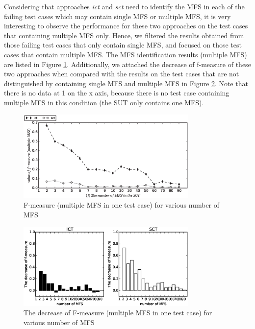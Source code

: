 \documentclass[10pt,journal,compsoc]{IEEEtran}
\begin{document}
{\color{blue}
Considering that approaches \emph{ict} and \emph{sct} need to identify the MFS in each of the failing test cases which may contain single MFS or multiple MFS, it is very interesting to observe the performance for these two approaches on the test cases that containing multiple MFS only. Hence, we filtered the results obtained from those failing test cases that only contain single MFS, and focused on those test cases that contain multiple MFS. The MFS identification results (multiple MFS) are listed in Figure \ref{sen_mfs_multi_tests_result}. Additionally, we attached the decrease of f-measure of these two approaches when compared with the results on the test cases that are  not distinguished by containing single MFS and multiple MFS in Figure \ref{decrease_sen_mfs_multi_tests_result}. Note that there is no data at 1 on the x axis, because there is no test case containing multiple MFS in this condition (the SUT only contains one MFS).

\begin{figure}[htbp]
 \includegraphics[width=3.5in]{fmeasuremulti.eps}
\caption{F-measure (multiple MFS in one test case) for various number of MFS}
\label{sen_mfs_multi_tests_result}
\end{figure}

\begin{figure}[htbp]
 \includegraphics[width=3.5in]{decreasingoffmeasure.eps}
\caption{The decrease of F-measure (multiple MFS in one test case) for various number of MFS}
\label{decrease_sen_mfs_multi_tests_result}
\end{figure}

}
\end{document}
